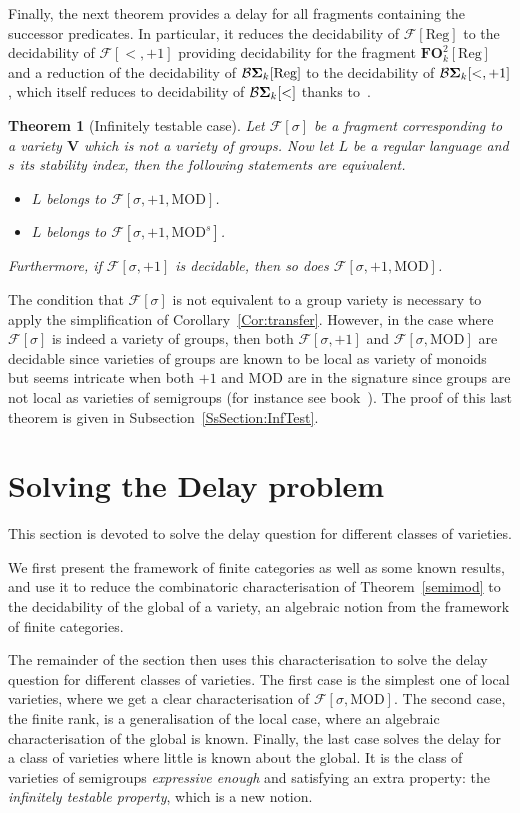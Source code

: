 \documentclass[submission,hidelink]{dmtcs-episciences}
\newtheorem{theorem}{Theorem}
\newcommand{\V}{\mathbf{V}}
\newcommand{\cF}{\mathcal{F}}
\newcommand{\FO}{\mathbf{FO}}
\newcommand{\BS}{\mathbf{{\cal B}\Sigma}}
\newcommand{\Reg}{\mathrm{Reg}}
\newcommand{\MOD}{\mathrm{MOD}}
\newcommand{\Fsigmod}{\cF[\sigma,\MOD]}
\begin{document}
Finally, the next theorem provides a delay for all fragments containing the successor predicates. In particular,
it reduces the decidability of $\cF[\Reg]$ to the decidability of $\cF[<,+1]$ providing decidability for the fragment
$\FO^2_k[\Reg]$ and a reduction of the decidability of $\BS_k[\Reg]$ to the decidability of $\BS_k[<,+1]$, which itself reduces
to decidability of $\BS_k[<]$ thanks to~\cite{Straubing85}.
\begin{theorem}[Infinitely testable case]\label{Main:InfTest}
Let $\cF[\sigma]$ be a fragment corresponding to a variety $\V$ which is not a variety of groups.
Now let $L$ be a regular language and $s$ its stability index, then the following statements are equivalent.
\begin{itemize}
	\item  $L$ belongs to $\cF[\sigma,+1,\MOD]$.
	\item  $L$ belongs to $\cF[\sigma,+1,\MOD^{s}]$.
\end{itemize}
Furthermore, if $\cF[\sigma,+1]$ is decidable, then so does $\cF[\sigma,+1,\MOD]$.
\end{theorem}
The condition that $\cF[\sigma]$ is not equivalent to a group variety is necessary to apply the simplification of Corollary~\ref{Cor:transfer}.
However, in the case where $\cF[\sigma]$ is indeed a variety of groups, then both $\cF[\sigma,+1]$ and $\cF[\sigma,\MOD]$ are decidable
since varieties of groups are known to be local as variety of monoids but seems intricate when both $+1$ and $\MOD$ are in the signature since groups are not local as varieties of semigroups (for instance see book~\cite[page 104]{RS09}).
The proof of this last theorem is given in Subsection~\ref{SsSection:InfTest}.

\section{Solving the Delay problem}\label{Section:Delay}



This section is devoted to solve the delay question for different classes of varieties.

We first present the framework of finite categories as well as some known results, and use it to
reduce the combinatoric characterisation of Theorem~\ref{semimod} to the decidability of the global of a variety, an algebraic notion from the framework of finite categories.


The remainder of the section then uses this characterisation to solve the delay question for different classes of varieties.
The first case is the simplest one of local varieties, where we get a clear characterisation of $\Fsigmod$.
The second case, the finite rank, is a generalisation of the local case, where an algebraic characterisation of the global is known.
Finally, the last case solves the delay for a class of varieties where little is known about the global.
It is the class of varieties of semigroups \emph{expressive enough} and satisfying an extra property:
the \emph{infinitely testable property}, which is a new notion.
\end{document}
